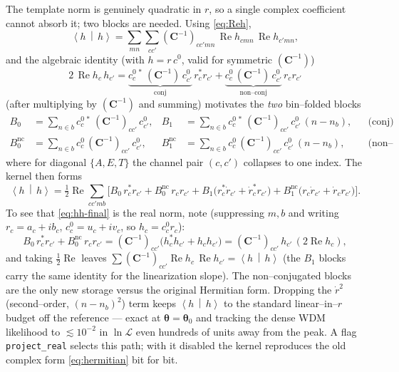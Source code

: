 \documentclass[11pt]{article}
\newcommand{\re}{\operatorname{Re}}
\newcommand{\ip}[2]{\left\langle #1 \,\middle|\, #2 \right\rangle}
\newcommand{\cc}{c'}
\newcommand{\invC}{(\bm{C}^{-1})}
\begin{document}
The template norm is genuinely quadratic in $r$, so a single complex coefficient
cannot absorb it; two blocks are needed. Using \eqref{eq:Reh},
\begin{equation}
\ip{h}{h}=\sum_{mn}\sum_{c\cc}\invC_{c\cc mn}\,\re h_{cmn}\,\re h_{\cc mn},
\end{equation}
and the algebraic identity (with $h=r\,c^0$, valid for symmetric $\invC$)
\begin{equation}
2\,\re h_{c}\,h_{\cc}
 = \underbrace{c^{0\,*}_{c}\,\invC\,c^0_{\cc}}_{\text{conj}}\,r_c^{*}r_{\cc}
   + \underbrace{c^0_{c}\,\invC\,c^0_{\cc}}_{\text{non--conj}}\,r_c r_{\cc}
\end{equation}
(after multiplying by $\invC$ and summing) motivates the \emph{two} bin--folded
blocks
\begin{align}
B_0 &= \sum_{n\in b} c^{0\,*}_{c}\,\invC_{c\cc}\,c^0_{\cc}, &
B_1 &= \sum_{n\in b} c^{0\,*}_{c}\,\invC_{c\cc}\,c^0_{\cc}\,(n-n_b), &&\text{(conj)}\\
B_0^{\mathrm{nc}} &= \sum_{n\in b} c^0_{c}\,\invC_{c\cc}\,c^0_{\cc}, &
B_1^{\mathrm{nc}} &= \sum_{n\in b} c^0_{c}\,\invC_{c\cc}\,c^0_{\cc}\,(n-n_b),
   &&\text{(non--conj)}
\end{align}
where for diagonal $\{A,E,T\}$ the channel pair $(c,\cc)$ collapses to one index.
The kernel then forms
\begin{equation}
\boxed{\;
\ip{h}{h}=\tfrac12\re\!\sum_{c\cc mb}\Big[
   B_0\,r_c^{*}r_{\cc} + B_0^{\mathrm{nc}}\,r_c r_{\cc}
 + B_1\big(r_c^{*}\dot r_{\cc}+\dot r_c^{*}r_{\cc}\big)
 + B_1^{\mathrm{nc}}\big(r_c\dot r_{\cc}+\dot r_c r_{\cc}\big)\Big].\;}
\label{eq:hh-final}
\end{equation}
To see that \eqref{eq:hh-final} is the real norm, note (suppressing $m,b$ and
writing $r_c=a_c+ib_c$, $c^0_c=u_c+iv_c$, so $h_c=c^0_c r_c$):
\begin{equation}
B_0\,r_c^{*}r_{\cc}+B_0^{\mathrm{nc}}\,r_c r_{\cc}
 = \invC_{c\cc}\big(h_c^{*}h_{\cc}+h_c h_{\cc}\big)
 = \invC_{c\cc}\,h_{\cc}\,(2\re h_c),
\end{equation}
and taking $\tfrac12\re$ leaves $\sum\invC_{c\cc}\re h_c\,\re h_{\cc}=\ip{h}{h}$
(the $B_1$ blocks carry the same identity for the linearization slope). The
non--conjugated blocks are the only new storage versus the original Hermitian
form. Dropping the $\dot r^2$ (second--order, $(n-n_b)^2$) term keeps $\ip{h}{h}$
to the standard linear--in--$r$ budget off the reference --- exact at
$\bm\theta=\bm\theta_0$ and tracking the dense WDM likelihood to
$\lesssim10^{-2}$ in $\ln\mathcal L$ even hundreds of units away from the peak.
A flag \texttt{project\_real} selects this path; with it disabled the kernel
reproduces the old complex form \eqref{eq:hermitian} bit for bit.
\end{document}
